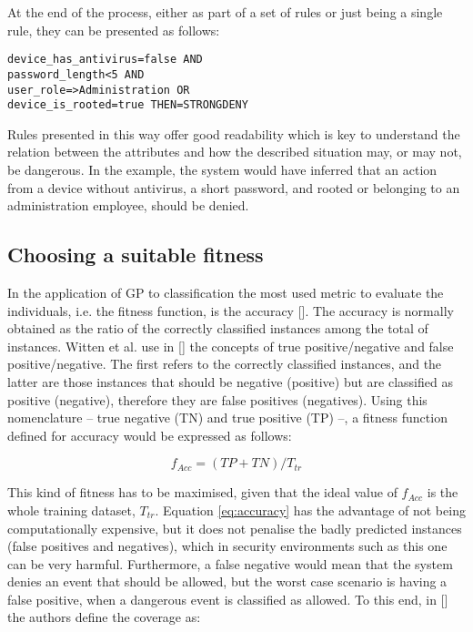 At the end of the process, either as part of a set of rules or just being a single rule, they can be presented as follows:

\begin{verbatim}
device_has_antivirus=false AND
password_length<5 AND
user_role=>Administration OR
device_is_rooted=true THEN=STRONGDENY
\end{verbatim}

Rules presented in this way offer good readability which is key to understand the relation between the attributes and how the described situation may, or may not, be dangerous. In the example, the system would have inferred that an action from a device without antivirus, a short password, and rooted or belonging to an administration employee, should be denied.

\subsection{Choosing a suitable fitness}
\label{subsec:chossingfitness}

In the application of GP to classification
the most used metric to evaluate the individuals, i.e. the fitness function, is the accuracy
[\cite{espejo2010survey}]. The accuracy is normally obtained as the
ratio of the correctly classified instances among the total of
instances. Witten et al. use in [\cite{witten2005data}] the
concepts of true positive/negative and false positive/negative. The
first refers to the correctly classified instances, and the latter are
those instances that should be negative (positive) but are classified
as positive (negative), therefore they are false positives
(negatives). Using this nomenclature -- true negative (TN) and true positive (TP) --, a fitness function defined for
accuracy would be expressed as follows: 

\begin{equation}
\label{eq:accuracy}
f_{Acc} = (TP + TN) / T_{tr}
\end{equation}

This kind of fitness has to be maximised, given that the ideal value
of $f_{Acc}$ is the whole training dataset, $T_{tr}$. Equation \ref{eq:accuracy} has the 
advantage of not being computationally expensive, but it does not
penalise the badly predicted instances (false positives and
negatives), which in security environments such as this one can be
very harmful. Furthermore, a false negative would mean that the system denies an event that should be allowed, but the worst case scenario is having a false positive, when a dangerous event is classified as allowed.
To this end, in [\cite{witten2005data}] the authors define the coverage as:

